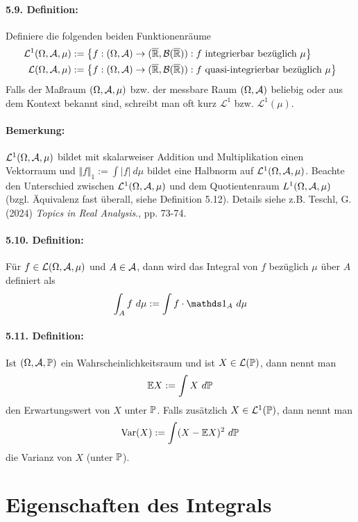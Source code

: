  \paragraph{5.9. Definition:}Definiere die folgenden beiden Funktionenr\"aume
 \begin{align*}
     \mathcal{L}^1(\Omega,\mathcal{A},\mu)&:=\left\{f:(\Omega,\mathcal{A})\to(\overline{\mathbb{R}},\mathcal{B}(\overline{\mathbb{R}})):f\text{ integrierbar bez\"uglich } \mu \right\} \\
     \mathcal{L}(\Omega,\mathcal{A},\mu)&:=\left\{f:(\Omega,\mathcal{A})\to(\overline{\mathbb{R}},\mathcal{B}(\overline{\mathbb{R}})):f\text{ quasi-integrierbar bez\"uglich } \mu \right\}
 \end{align*}
 Falls der Ma\ss{}raum $(\Omega,\mathcal{A},\mu)$ bzw. der messbare Raum $(\Omega,\mathcal{A})$ beliebig oder aus dem Kontext bekannt sind, schreibt man oft kurz $\mathcal{L}^1$ bzw. $\mathcal{L}^1(\mu)$.
 
 \paragraph{Bemerkung:}$\mathcal{L}^1(\Omega,\mathcal{A},\mu)$ bildet mit skalarweiser Addition und Multiplikation einen Vektorraum und $\Vert f\Vert_1:=\int |f|\ d\mu$ bildet eine Halbnorm auf $\mathcal{L}^1(\Omega,\mathcal{A},\mu)$. Beachte den Unterschied zwischen $\mathcal{L}^1(\Omega,\mathcal{A},\mu)$ und dem Quotientenraum $L^1(\Omega,\mathcal{A},\mu)$ (bzgl. \"Aquivalenz fast \"uberall, siehe Definition 5.12). Details siehe z.B. Teschl, G. (2024) \textit{Topics in Real Analysis}., pp. 73-74. 
 
 \paragraph{5.10. Definition:}F\"ur $f\in\mathcal{L}(\Omega,\mathcal{A},\mu)$ und $A\in\mathcal{A}$, dann wird das Integral von $f$ bez\"uglich $\mu$ \"uber $A$ definiert als
 $$\int_A f\ d\mu:=\int f\cdot\ind{A}\ d\mu$$
 
 \paragraph{5.11. Definition:}Ist $(\Omega, \mathcal{A}, \mathbb{P})$ ein Wahrscheinlichkeitsraum und ist $X\in \mathcal{L}(\mathbb{P})$, dann nennt man 
 $$\mathbb{E} X:=\int X\ d\mathbb{P}$$
 den Erwartungswert von $X$ unter $\mathbb{P}$. Falls zus\"atzlich $X\in\mathcal{L}^1(\mathbb{P})$, dann nennt man
 $$\operatorname{Var}(X):=\int (X-\E X)^2\ d\Pp$$
 die Varianz von $X$ (unter $\mathbb{P}$).
 
 \section*{Eigenschaften des Integrals}
  
